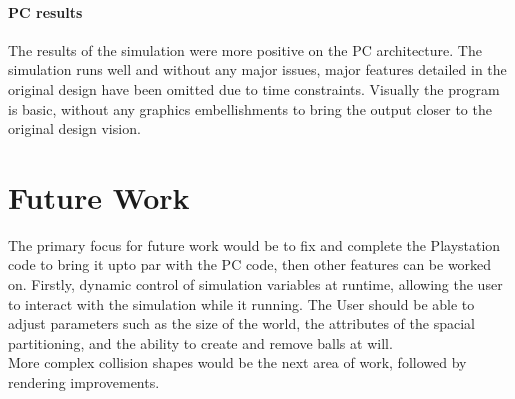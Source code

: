 \documentclass[conference]{acmsiggraph}
\begin{document}
\paragraph{PC results}
The results of the simulation were more positive on the PC architecture. The simulation runs well and without any major issues, major features detailed in the original design have been omitted due to time constraints. Visually the program is basic, without any graphics embellishments to bring the output closer to the original design vision.

\section{Future Work}
The primary focus for future work would be to fix and complete the Playstation code to bring it upto par with the PC code, then other features can be worked on. Firstly, dynamic control of simulation variables at runtime, allowing the user to interact with the simulation while it running. The User should be able to adjust parameters such as the  size of the world, the attributes of the spacial partitioning, and the ability to create and remove balls at will.\\
More complex collision shapes would be the next area of work, followed by rendering improvements.



\end{document}
